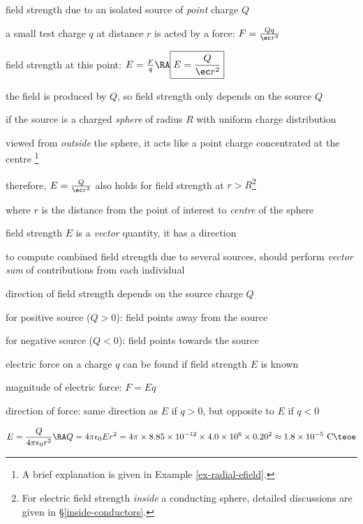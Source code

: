 \cmt field strength due to an isolated source of \emph{point} charge $Q$

a small test charge $q$ at distance $r$ is acted by a force: $F = \frac{Qq}{\ec r^2}$

field strength at this point: $ E = \frac{F}{q} \RA \boxed{E=\frac{Q}{\ec r^2}}$

the field is produced by $Q$, so field strength only depends on the source $Q$

\cmt if the source is a charged \emph{sphere} of radius $R$ with uniform charge distribution

viewed from \emph{outside} the sphere, it acts like a point charge concentrated at the centre
\footnote{A brief explanation is given in Example \ref{ex-radial-efield}.}

therefore, $E=\frac{Q}{\ec r^2}$ also holds for field strength at $r>R$\footnote{For electric field strength \emph{inside} a conducting sphere, detailed discussions are given in \S\ref{inside-conductors}.}

where $r$ is the distance from the point of interest to \emph{centre} of the sphere

\cmt field strength $E$ is a \emph{vector} quantity, it has a direction

to compute combined field strength due to several sources, should perform \emph{vector sum} of contributions from each individual

\cmt direction of field strength depends on the source charge $Q$

for positive source ($Q>0$): field points away from the source

for negative source ($Q<0$): field points towards the source

\cmt electric force on a charge $q$ can be found if field strength $E$ is known

magnitude of electric force: $F=Eq$

direction of force: same direction as $E$ if $q>0$, but opposite to $E$ if $q<0$


	
\solc 
\begin{equation*}
	E = \frac{Q}{4\pi\epsilon_0 r^2} \RA Q=4\pi\epsilon_0 Er^2 = 4\pi \times 8.85\times 10^{-12} \times 4.0 \times 10^6 \times 0.20^2 \approx 1.8 \times 10^{-5} \text{ C} \teoe
\end{equation*}



